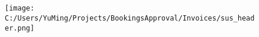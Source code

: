 \documentclass{article}%
\begin{document}
%
\normalsize%
\section{ }%
\label{sec: }%


\begin{figure}[h!]%
\centering%
\texttt{[image: C:/Users/YuMing/Projects/BookingsApproval/Invoices/sus\_header.png]}%
\end{figure}

%
\end{document}
